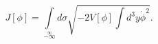 \begin{equation}\label{Jacobi}J[\phi]=\int\limits _{-\infty}\limits^{\infty}d\sigma
\sqrt{-2V[\phi]\int\! d^3y\dot{\phi}^2 }.\end{equation} 
